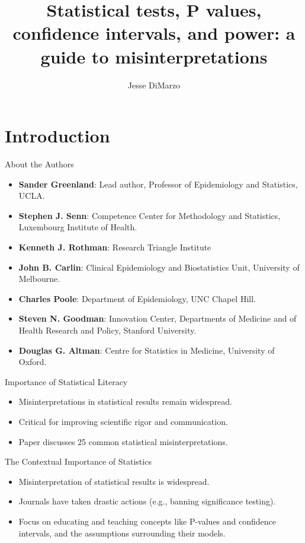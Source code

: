 \documentclass[aspectratio=169, 12pt]{beamer}
\title{Statistical tests, P values, confidence intervals, and power: a guide
to misinterpretations}
\author{Jesse DiMarzo}
\date{}
\begin{document}
 
\frame{\titlepage}

\section{Introduction}
\begin{frame}{About the Authors}
\begin{itemize}
    \item \textbf{Sander Greenland}: Lead author, Professor of Epidemiology and Statistics, UCLA.
    \item \textbf{Stephen J. Senn}: Competence Center for Methodology and Statistics, Luxembourg Institute of Health.
    \item \textbf{Kenneth J. Rothman}: Research Triangle Institute
    \item \textbf{John B. Carlin}: Clinical Epidemiology and Biostatistics Unit, University of Melbourne.
    \item \textbf{Charles Poole}: Department of Epidemiology, UNC Chapel Hill.
    \item \textbf{Steven N. Goodman}:  Innovation Center, Departments of Medicine
and of Health Research and Policy, Stanford University.
    \item \textbf{Douglas G. Altman}: Centre for Statistics in Medicine, University of Oxford.
\end{itemize}
\end{frame}
 

\begin{frame}{Importance of Statistical Literacy}
\begin{itemize}
    \item Misinterpretations in statistical results remain widespread.
    \vspace{0.5cm}
    \item Critical for improving scientific rigor and communication. 
    \vspace{0.5cm}
    \item Paper discusses 25 common statistical misinterpretations.
\end{itemize}
\end{frame}




\begin{frame}{The Contextual Importance of Statistics}
\begin{itemize}
    \item Misinterpretation of statistical results is widespread.
    \vspace{0.5cm}
    \item Journals have taken drastic actions (e.g., banning significance testing).
    \vspace{0.5cm}
    \item Focus on educating and teaching concepts like P-values and confidence intervals, and the assumptions surrounding their models.
\end{itemize}
\end{frame}
\end{document}
